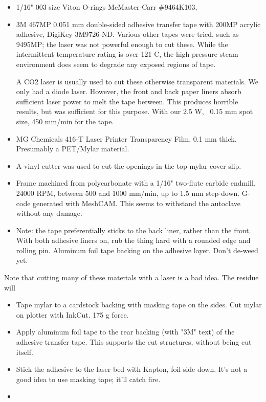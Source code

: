 \documentclass[paper.tex]{subfiles}
\begin{document}
\begin{itemize}
	\item 1/16" 003 size Viton O-rings McMaster-Carr \#9464K103, 
	\item 3M 467MP 0.051 mm double-sided adhesive transfer tape with 200MP acrylic adhesive, DigiKey 3M9726-ND.
	Various other tapes were tried, such as 9495MP; the laser was not powerful enough to cut these.
	While the intermittent temperature rating is over 121 C, the high-pressure steam environment does seem to degrade any exposed regions of tape.
	
	A CO2 laser is usually used to cut these otherwise transparent materials. We only had a diode laser. However, the front and back paper liners absorb sufficient laser power to melt the tape between. This produces horrible results, but was sufficient for this purpose. With our 2.5 W, ~0.15 mm spot size, 450 mm/min for the tape.
	
	\item MG Chemicals 416-T Laser Printer Transparency Film, 0.1 mm thick. Presumably a PET/Mylar material.
	
	\item A vinyl cutter was used to cut the openings in the top mylar cover slip.
	\item Frame machined from polycarbonate with a 1/16" two-flute carbide endmill, 24000 RPM, between 500 and 1000 mm/min, up to 1.5 mm step-down. G-code generated with MeshCAM. This seems to withstand the autoclave without any damage.
	\item Note: the tape preferentially sticks to the back liner, rather than the front.
	With both adhesive liners on, rub the thing hard with a rounded edge and rolling pin.
	Aluminum foil tape backing on the adhesive layer.
	Don't de-weed yet. 
	
	
\end{itemize}

Note that cutting many of these materials with a laser is a bad idea. The residue will 

\begin{itemize}
	\item Tape mylar to a cardstock backing with masking tape on the sides. Cut mylar on plotter with InkCut. 175 g force. 
	\item Apply aluminum foil tape to the rear backing (with "3M" text) of the adhesive transfer tape. This supports the cut structures, without being cut itself.
	\item Stick the adhesive to the laser bed with Kapton, foil-side down. It's not a good idea to use masking tape; it'll catch fire.
	\item 
\end{itemize}
\end{document}
